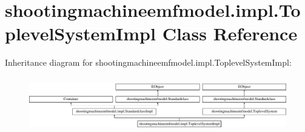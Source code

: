 \hypertarget{classshootingmachineemfmodel_1_1impl_1_1_toplevel_system_impl}{\section{shootingmachineemfmodel.\-impl.\-Toplevel\-System\-Impl Class Reference}
\label{classshootingmachineemfmodel_1_1impl_1_1_toplevel_system_impl}
}
Inheritance diagram for shootingmachineemfmodel.\-impl.\-Toplevel\-System\-Impl\-:\begin{figure}[H]
\begin{center}
\leavevmode
\includegraphics[height=2.432139cm]{classshootingmachineemfmodel_1_1impl_1_1_toplevel_system_impl}
\end{center}
\end{figure}
